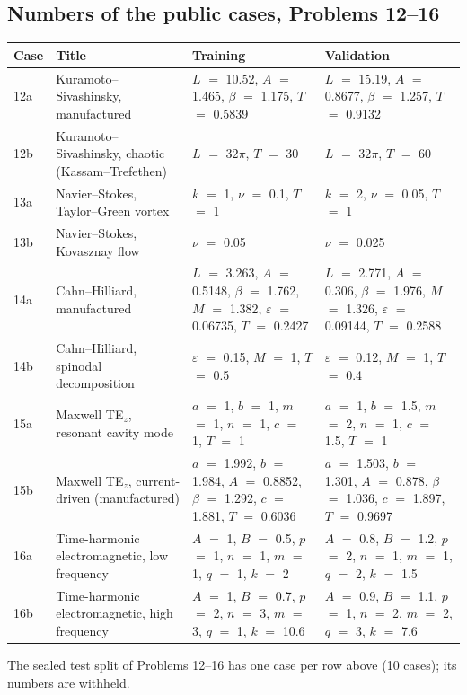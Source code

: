 \documentclass[11pt]{article}
\begin{document}
\subsection*{Numbers of the public cases, Problems 12--16}
\begin{center}
\footnotesize
\begin{tabular}{lp{3.4cm}p{4.7cm}p{4.7cm}}
\toprule
Case & Title & Training & Validation \\
\midrule
12a & Kuramoto--Sivashinsky, manufactured & $L$ $=$ 10.52, $A$ $=$ 1.465, $\beta$ $=$ 1.175, $T$ $=$ 0.5839 & $L$ $=$ 15.19, $A$ $=$ 0.8677, $\beta$ $=$ 1.257, $T$ $=$ 0.9132 \\
12b & Kuramoto--Sivashinsky, chaotic (Kassam--Trefethen) & $L$ $=$ $32\pi$, $T$ $=$ 30 & $L$ $=$ $32\pi$, $T$ $=$ 60 \\
13a & Navier--Stokes, Taylor--Green vortex & $k$ $=$ 1, $\nu$ $=$ 0.1, $T$ $=$ 1 & $k$ $=$ 2, $\nu$ $=$ 0.05, $T$ $=$ 1 \\
13b & Navier--Stokes, Kovasznay flow & $\nu$ $=$ 0.05 & $\nu$ $=$ 0.025 \\
14a & Cahn--Hilliard, manufactured & $L$ $=$ 3.263, $A$ $=$ 0.5148, $\beta$ $=$ 1.762, $M$ $=$ 1.382, $\varepsilon$ $=$ 0.06735, $T$ $=$ 0.2427 & $L$ $=$ 2.771, $A$ $=$ 0.306, $\beta$ $=$ 1.976, $M$ $=$ 1.326, $\varepsilon$ $=$ 0.09144, $T$ $=$ 0.2588 \\
14b & Cahn--Hilliard, spinodal decomposition & $\varepsilon$ $=$ 0.15, $M$ $=$ 1, $T$ $=$ 0.5 & $\varepsilon$ $=$ 0.12, $M$ $=$ 1, $T$ $=$ 0.4 \\
15a & Maxwell TE$_z$, resonant cavity mode & $a$ $=$ 1, $b$ $=$ 1, $m$ $=$ 1, $n$ $=$ 1, $c$ $=$ 1, $T$ $=$ 1 & $a$ $=$ 1, $b$ $=$ 1.5, $m$ $=$ 2, $n$ $=$ 1, $c$ $=$ 1.5, $T$ $=$ 1 \\
15b & Maxwell TE$_z$, current-driven (manufactured) & $a$ $=$ 1.992, $b$ $=$ 1.984, $A$ $=$ 0.8852, $\beta$ $=$ 1.292, $c$ $=$ 1.881, $T$ $=$ 0.6036 & $a$ $=$ 1.503, $b$ $=$ 1.301, $A$ $=$ 0.878, $\beta$ $=$ 1.036, $c$ $=$ 1.897, $T$ $=$ 0.9697 \\
16a & Time-harmonic electromagnetic, low frequency & $A$ $=$ 1, $B$ $=$ 0.5, $p$ $=$ 1, $n$ $=$ 1, $m$ $=$ 1, $q$ $=$ 1, $k$ $=$ 2 & $A$ $=$ 0.8, $B$ $=$ 1.2, $p$ $=$ 2, $n$ $=$ 1, $m$ $=$ 1, $q$ $=$ 2, $k$ $=$ 1.5 \\
16b & Time-harmonic electromagnetic, high frequency & $A$ $=$ 1, $B$ $=$ 0.7, $p$ $=$ 2, $n$ $=$ 3, $m$ $=$ 3, $q$ $=$ 1, $k$ $=$ 10.6 & $A$ $=$ 0.9, $B$ $=$ 1.1, $p$ $=$ 1, $n$ $=$ 2, $m$ $=$ 2, $q$ $=$ 3, $k$ $=$ 7.6 \\
\bottomrule
\end{tabular}
\end{center}
The sealed test split of Problems 12--16 has one case per row above (10 cases); its numbers are withheld.
\end{document}
